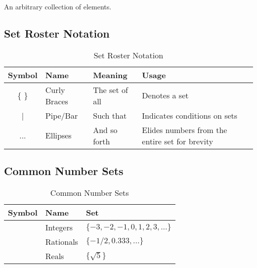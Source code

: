 \documentclass[11pt]{article}
\begin{document}
\begin{definition}[Set]\label{def:set}
An arbitrary collection of elements.
\end{definition}

\subsection{Set Roster Notation}
\begin{table}[!htbp]
    \centering
    \caption{Set Roster Notation}
    \begin{tabular}{ c l l l }
        \toprule
        Symbol  & Name          & Meaning           & Usage \\
        \midrule
        \{ \}   & Curly Braces  & The set of all    & Denotes a set \\
        |       & Pipe/Bar      & Such that         & Indicates conditions on sets \\
        ...     & Ellipses      & And so forth      & Elides numbers from the entire set for brevity \\
        \bottomrule
    \end{tabular}
    \label{tab:tbl-set-notation}
\end{table}

\subsection{Common Number Sets}

\begin{table}[!htbp]
    \centering
    \begin{tabular}{ c l l }
        \toprule
        Symbol  & Name      & Set \\
        \midrule
        \Z      & Integers  & $\{-3,-2,-1,0,1,2,3, ... \}$ \\
        \Q      & Rationals & $\{ -1/2, 0.333, ... \}$ \\
        \R      & Reals     & $\{ \sqrt{5} \}$ \\
        \bottomrule
    \end{tabular}
    \label{tab:tbl-number-sets}
    \caption{Common Number Sets}
\end{table}
\end{document}
